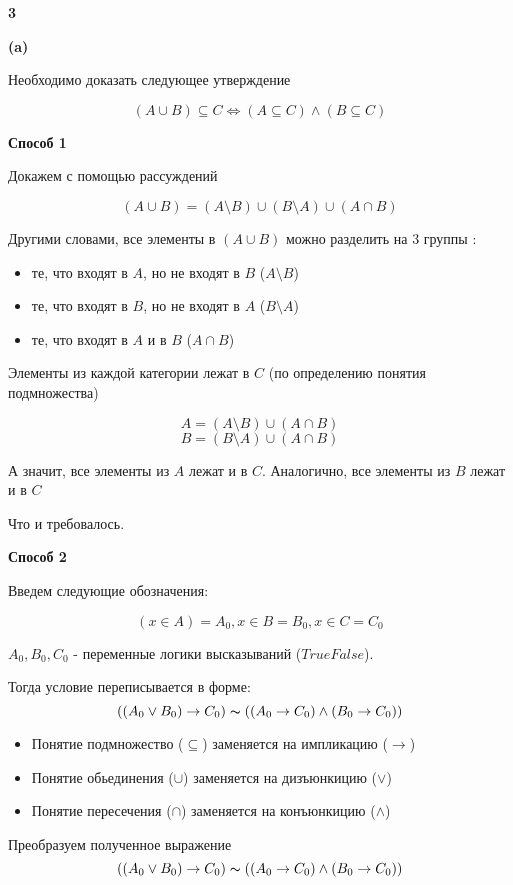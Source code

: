 \documentclass{article}
\begin{document}
\textbf {3}

\textbf {(a)}

Необходимо доказать следующее утверждение

$$ (A \cup B) \subseteq C \iff (A \subseteq C) \wedge (B \subseteq C) $$

\textbf{Способ 1} 

Докажем с помощью рассуждений

$$(A \cup B) = (A \setminus B) \cup (B \setminus A) \cup (A \cap B)$$

Другими словами, все элементы в $(A \cup B)$ можно разделить на 3 группы : 
\begin{itemize}
    \item те, что входят в $A$, но не входят в $B$ ($A \setminus B$)
    \item те, что входят в $B$, но не входят в $A$ ($B \setminus A$)
    \item те, что входят в $A$ и в $B$ ($A \cap B$)
\end{itemize}
 
Элементы из каждой категории лежат в $C$ (по определению понятия подмножества) 

$$A = (A \setminus B ) \cup (A \cap B)$$
$$B = (B \setminus A ) \cup (A \cap B)$$

А значит, все элементы из $A$ лежат и в $C$. Аналогично, все элементы из $B$ лежат и в $C$

Что и требовалось.

\textbf{Способ 2} 

Введем следующие обозначения: 

$$ (x \in A) = A_0, x \in B = B_0, x \in C = C_0$$

$A_0, B_0, C_0$ - переменные логики высказываний ($True False$). 

Тогда условие переписывается в форме:
$$((A_0 \vee B_0) \rightarrow C_0) \thicksim ((A_0 \rightarrow C_0) \wedge (B_0 \rightarrow C_0)) $$

\begin{itemize}
    \item Понятие подмножество ($\subseteq$) заменяется на импликацию ($\rightarrow$)
    \item Понятие обьединения ($\cup$) заменяется на дизъюнкицию ($\vee$)
    \item Понятие пересечения ($\cap$) заменяется на конъюнкицию ($\wedge$)
\end{itemize}

Преобразуем полученное выражение
$$((A_0 \vee B_0) \rightarrow C_0) \thicksim ((A_0 \rightarrow C_0) \wedge (B_0 \rightarrow C_0)) $$
\end{document}

